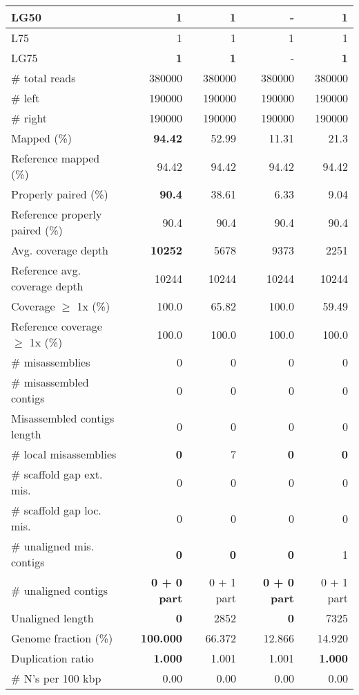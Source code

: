 \documentclass[12pt,a4paper]{article}
\begin{document}
\begin{table}[ht]
\begin{center}
\begin{tabular}{|l*{4}{|r}|}
LG50 & {\bf 1} & {\bf 1} & - & {\bf 1} \\ \hline
L75 & 1 & 1 & 1 & 1 \\ \hline
LG75 & {\bf 1} & {\bf 1} & - & {\bf 1} \\ \hline
\# total reads & 380000 & 380000 & 380000 & 380000 \\ \hline
\# left & 190000 & 190000 & 190000 & 190000 \\ \hline
\# right & 190000 & 190000 & 190000 & 190000 \\ \hline
Mapped (\%) & {\bf 94.42} & 52.99 & 11.31 & 21.3 \\ \hline
Reference mapped (\%) & 94.42 & 94.42 & 94.42 & 94.42 \\ \hline
Properly paired (\%) & {\bf 90.4} & 38.61 & 6.33 & 9.04 \\ \hline
Reference properly paired (\%) & 90.4 & 90.4 & 90.4 & 90.4 \\ \hline
Avg. coverage depth & {\bf 10252} & 5678 & 9373 & 2251 \\ \hline
Reference avg. coverage depth & 10244 & 10244 & 10244 & 10244 \\ \hline
Coverage $\geq$ 1x (\%) & 100.0 & 65.82 & 100.0 & 59.49 \\ \hline
Reference coverage $\geq$ 1x (\%) & 100.0 & 100.0 & 100.0 & 100.0 \\ \hline
\# misassemblies & 0 & 0 & 0 & 0 \\ \hline
\# misassembled contigs & 0 & 0 & 0 & 0 \\ \hline
Misassembled contigs length & 0 & 0 & 0 & 0 \\ \hline
\# local misassemblies & {\bf 0} & 7 & {\bf 0} & {\bf 0} \\ \hline
\# scaffold gap ext. mis. & 0 & 0 & 0 & 0 \\ \hline
\# scaffold gap loc. mis. & 0 & 0 & 0 & 0 \\ \hline
\# unaligned mis. contigs & {\bf 0} & {\bf 0} & {\bf 0} & 1 \\ \hline
\# unaligned contigs & {\bf 0 + 0 part} & 0 + 1 part & {\bf 0 + 0 part} & 0 + 1 part \\ \hline
Unaligned length & {\bf 0} & 2852 & {\bf 0} & 7325 \\ \hline
Genome fraction (\%) & {\bf 100.000} & 66.372 & 12.866 & 14.920 \\ \hline
Duplication ratio & {\bf 1.000} & 1.001 & 1.001 & {\bf 1.000} \\ \hline
\# N's per 100 kbp & 0.00 & 0.00 & 0.00 & 0.00 \\ \hline

\end{tabular}
\end{center}
\end{table}
\end{document}
